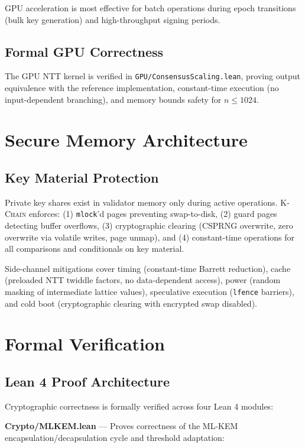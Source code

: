 \documentclass[11pt,letterpaper]{article}
\theoremstyle{definition}
\theoremstyle{remark}
\newcommand{\KChain}{\textsc{K-Chain}}
\begin{document}
GPU acceleration is most effective for batch operations during epoch transitions (bulk key generation) and high-throughput signing periods.

\subsection{Formal GPU Correctness}

The GPU NTT kernel is verified in \texttt{GPU/ConsensusScaling.lean}, proving output equivalence with the reference implementation, constant-time execution (no input-dependent branching), and memory bounds safety for $n \leq 1024$.

\section{Secure Memory Architecture}

\subsection{Key Material Protection}

Private key shares exist in validator memory only during active operations. \KChain{} enforces: (1) \texttt{mlock}'d pages preventing swap-to-disk, (2) guard pages detecting buffer overflows, (3) cryptographic clearing (CSPRNG overwrite, zero overwrite via volatile writes, page unmap), and (4) constant-time operations for all comparisons and conditionals on key material.

Side-channel mitigations cover timing (constant-time Barrett reduction), cache (preloaded NTT twiddle factors, no data-dependent access), power (random masking of intermediate lattice values), speculative execution (\texttt{lfence} barriers), and cold boot (cryptographic clearing with encrypted swap disabled).

\section{Formal Verification}

\subsection{Lean 4 Proof Architecture}

Cryptographic correctness is formally verified across four Lean 4 modules:

\textbf{Crypto/MLKEM.lean} --- Proves correctness of the ML-KEM encapsulation/decapsulation cycle and threshold adaptation:
\end{document}
